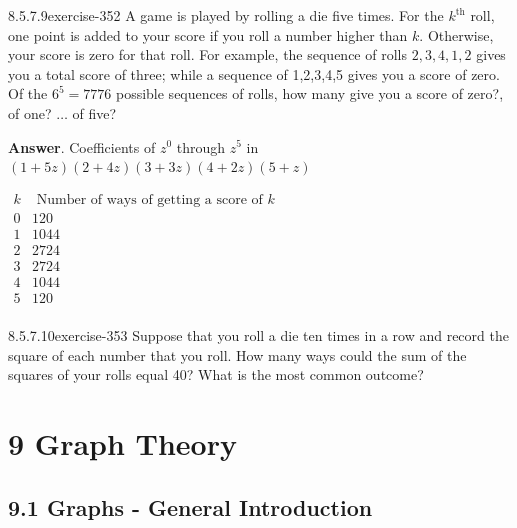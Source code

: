 \documentclass[twoside,10pt,]{book}
\numberwithin{equation}{section}
\begin{document}
\begin{divisionsolution}{8.5.7.9}{}{exercise-352}%
\hypertarget{p-3011}{}%
A game is played by rolling a die five times. For the \(k^{\text{th}}\) roll, one point is added to your score if you roll a number higher than \(k\). Otherwise, your score is zero for that roll. For example, the sequence of rolls \(2,3,4,1,2\) gives you a total score of three; while a sequence of 1,2,3,4,5 gives you a score of zero. Of the \(6^5 = 7776\) possible sequences of rolls, how many give you a score of zero?, of one? \(\ldots \) of five?%
\par\smallskip%
\noindent\textbf{Answer}.\quad%
\hypertarget{p-3012}{}%
Coefficients of \(z^0\) through \(z^5\) in \((1+5z)(2+4z)(3+3z)(4+2z)(5+z)\)%
\par
\hypertarget{p-3013}{}%
\(\begin{array}{cc}
k & \textrm{ Number of ways of getting a score of } k \\
0 & 120 \\
1 & 1044 \\
2 & 2724 \\
3 & 2724 \\
4 & 1044 \\
5 & 120 \\
\end{array}\)%
\end{divisionsolution}%
\begin{divisionsolution}{8.5.7.10}{}{exercise-353}%
\hypertarget{p-3014}{}%
Suppose that you roll a die ten times in a row and record the square of each number that you roll. How many ways could the sum of the squares of your rolls equal 40? What is the most common outcome?%
\end{divisionsolution}%
\chapter*{9 Graph Theory}
\section*{9.1 Graphs - General Introduction}
\end{document}
